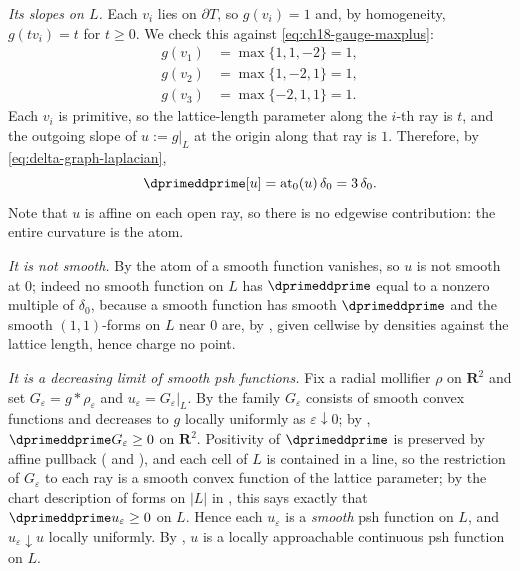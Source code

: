 \begin{example}
\emph{Its slopes on $L$.}  Each $v_i$ lies on $\partial T$, so $g(v_i)=1$
and, by homogeneity, $g(tv_i)=t$ for $t\geq0$.  We check this against
\eqref{eq:ch18-gauge-maxplus}:
\[
 \begin{aligned}
 g(v_1)&=\max\{1,1,-2\}=1,\\
 g(v_2)&=\max\{1,-2,1\}=1,\\
 g(v_3)&=\max\{-2,1,1\}=1 .
 \end{aligned}
\]
Each $v_i$ is primitive, so the lattice-length parameter along the $i$-th
ray is $t$, and the outgoing slope of $u:=g|_L$ at the origin along that ray
is $1$.  Therefore, by \eqref{eq:delta-graph-laplacian},
\begin{equation}
\label{eq:ch18-gauge-atom}
 \dprimeddprime[u]=\operatorname{at}_0(u)\,\delta_0=3\,\delta_0 .
\end{equation}
Note that $u$ is affine on each open ray, so there is no edgewise
contribution: the entire curvature is the atom.

\emph{It is not smooth.}  By  the atom of a
smooth function vanishes, so $u$ is not smooth at $0$; indeed no smooth
function on $L$ has $\dprimeddprime$ equal to a nonzero multiple of
$\delta_0$, because a smooth function has smooth $\dprimeddprime$ and the
smooth $(1,1)$-forms on $L$ near $0$ are, by
, given cellwise by densities against the
lattice length, hence charge no point.

\emph{It is a decreasing limit of smooth psh functions.}  Fix a radial
mollifier $\rho$ on $\mathbf R^2$ and set $G_\varepsilon=g*\rho_\varepsilon$
and $u_\varepsilon=G_\varepsilon|_L$.  By
 the family $G_\varepsilon$ consists of
smooth convex functions and decreases to $g$ locally uniformly as
$\varepsilon\downarrow0$; by ,
$\dprimeddprime G_\varepsilon\geq0$ on $\mathbf R^2$.  Positivity of
$\dprimeddprime$ is preserved by affine pullback
( and
), and each cell of $L$ is contained in
a line, so the restriction of $G_\varepsilon$ to each ray is a smooth convex
function of the lattice parameter; by the chart description of forms on
$|L|$ in , this says exactly that
$\dprimeddprime u_\varepsilon\geq0$ on $L$.  Hence each $u_\varepsilon$ is a \emph{smooth} psh
function on $L$, and $u_\varepsilon\downarrow u$ locally uniformly.  By
, $u$ is a locally approachable continuous psh
function on $L$.


\end{example}
